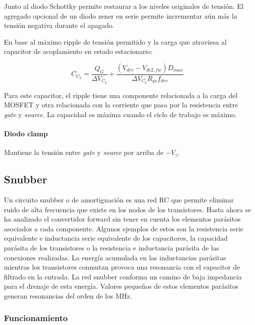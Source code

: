 Junto al diodo Schottky permite restaurar a los niveles originales de tensión. 
El agregado opcional de un diodo zener en serie permite incrementar aún más la tensión negativa durante el apagado. 

En base al máximo ripple de tensión permitido y la carga que atraviesa al capacitor de acoplamiento en estado estacionario:

$$ C_{C_2}=\frac{Q_G}{\Delta V_{C_2}}+\frac{(V_{drv}-V_{dc2,fw})D_{max}}{\Delta V_{C_2}R_{gs}f_{drv}} $$

Para este capacitor, el ripple tiene una componente relacionada a la carga del MOSFET 
y otra relacionada con la corriente que pasa por la resistencia entre \textit{gate} y \textit{source}. 
La capacidad es máxima cuando el ciclo de trabajo es máximo. 

\paragraph{Diodo clamp}

Mantiene la tensión entre \textit{gate} y \textit{source} por arriba de $-V_\gamma$.\\

\subsection{Snubber} \label{subsec:oscilaciones}

Un circuito snubber o de amortiguación es una red RC que permite eliminar ruido de alta frecuencia que existe en los nodos de los transistores.
Hasta ahora se ha analizado el convertidor forward sin tener en cuenta los elementos parásitos asociados a cada componente. 
Algunos ejemplos de estos son la resistencia serie equivalente e inductancia serie equivalente de los capacitores, 
la capacidad parásita de los transistores o la resistencia e inductancia parásita de las conexiones realizadas. 
La energía acumulada en las inductancias parásitas mientras los transistores conmutan provoca una resonancia con el capacitor de filtrado en la entrada. 
La red snubber conforma un camino de baja impedancia para el drenaje de esta energía. 
Valores pequeños de estos elementos parásitos generan resonancias del orden de los MHz. 

\subsubsection{Funcionamiento}


